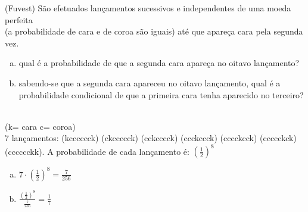 \begin{ex}
(Fuvest) São efetuados lançamentos sucessivos e independentes de uma moeda perfeita \\ (a probabilidade de cara e de coroa são iguais) até que apareça cara pela segunda vez.
   \begin{enumerate}[(a)]
   \item qual é a probabilidade de que a segunda cara apareça no oitavo lançamento?
   \item sabendo-se que a segunda cara apareceu no oitavo lançamento, qual é a probabilidade condicional de que a primeira cara tenha aparecido no terceiro?
   \end{enumerate}
    \begin{sol}
      \phantom{A}  \\
           (k= cara c= coroa)\\
           7 lançamentos: (kcccccck) (ckccccck) (cckcccck) (ccckccck) (cccckcck) (ccccckck) (cccccckk).
          A  probabilidade de cada  lançamento é: $(\frac{1}{2})^8$
     \begin{enumerate} [(a)]
           \item 
          $7\cdot(\frac{1}{2})^8=\frac{7}{256}$
          \item 
          $\frac{(\frac{1}{2})^8}{\frac{7}{256}}=\frac{1}{7}$
     \end{enumerate}
      
    \end{sol}
\end{ex}